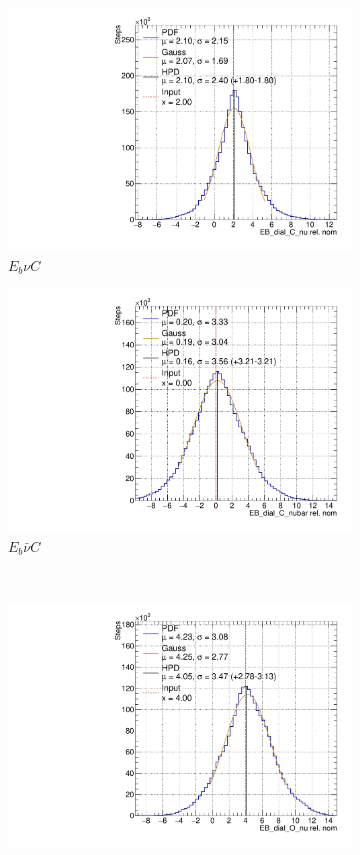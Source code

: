 \begin{figure}[t]
\centering
\begin{subfigure}{.48\textwidth}
  \centering
  \includegraphics[width=0.73\linewidth]{figs/EB_dial_C_nuAsmv}
  \caption{$E_{b}\nu C$}
\end{subfigure}
\begin{subfigure}{.48\textwidth}
  \centering
  \includegraphics[width=0.73\linewidth]{figs/EB_dial_C_nubarAsmv}
  \caption{$E_{b}\bar{\nu}C$}
\end{subfigure} \\
\begin{subfigure}{.48\textwidth}
  \centering
  \includegraphics[width=0.73\linewidth]{figs/EB_dial_O_nuAsmv}

\end{subfigure}
\end{figure}
